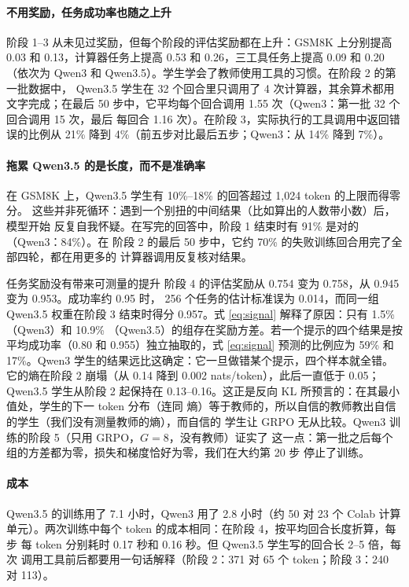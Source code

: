 \documentclass[11pt,a4paper,fontset=none]{ctexart}
\begin{document}
\paragraph{不用奖励，任务成功率也随之上升}
阶段 1--3 从未见过奖励，但每个阶段的评估奖励都在上升：GSM8K 上分别提高 0.03 和
0.13，计算器任务上提高 0.53 和 0.26，三工具任务上提高 0.09 和 0.20（依次为
Qwen3 和 Qwen3.5）。学生学会了教师使用工具的习惯。在阶段 2 的第一批数据中，
Qwen3.5 学生在 32 个回合里只调用了 4 次计算器，其余算术都用文字完成；在最后
50 步中，它平均每个回合调用 1.55 次（Qwen3：第一批 32 个回合调用 15 次，最后
每回合 1.16 次）。在阶段 3，实际执行的工具调用中返回错误的比例从 21\% 降到
4\%（前五步对比最后五步；Qwen3：从 14\% 降到 7\%）。

\paragraph{拖累 Qwen3.5 的是长度，而不是准确率}
在 GSM8K 上，Qwen3.5 学生有 10\%--18\% 的回答超过 1{,}024 token 的上限而得零分。
这些并非死循环：遇到一个别扭的中间结果（比如算出的人数带小数）后，模型开始
反复自我怀疑。在写完的回答中，阶段 1 结束时有 91\% 是对的（Qwen3：84\%）。在
阶段 2 的最后 50 步中，它约 70\% 的失败训练回合用完了全部四轮，都在用更多的
计算器调用反复核对结果。

\begin{findbox}{任务奖励没有带来可测量的提升}
阶段 4 的评估奖励从 0.754 变为 0.758，从 0.945 变为 0.953。成功率约 0.95 时，
256 个任务的估计标准误为 0.014，而同一组 Qwen3.5 权重在阶段 3 结束时得分
0.957。式 \eqref{eq:signal} 解释了原因：只有 1.5\%（Qwen3）和 10.9\%
（Qwen3.5）的组存在奖励方差。若一个提示的四个结果是按平均成功率（0.80 和
0.955）独立抽取的，式 \eqref{eq:signal} 预测的比例应为 59\% 和 17\%。Qwen3
学生的结果远比这确定：它一旦做错某个提示，四个样本就全错。它的熵在阶段 2 崩塌（从
0.14 降到 0.002 nats/token），此后一直低于 0.05；Qwen3.5 学生从阶段 2 起保持在
0.13--0.16。这正是反向 KL 所预言的：在其最小值处，学生的下一 token 分布（连同
熵）等于教师的，所以自信的教师教出自信的学生（我们没有测量教师的熵），而自信的
学生让 GRPO 无从比较。Qwen3 训练的阶段 5（只用 GRPO，$G=8$，没有教师）证实了
这一点：第一批之后每个组的方差都为零，损失和梯度恰好为零，我们在大约第 20 步
停止了训练。
\end{findbox}

\paragraph{成本}
Qwen3.5 的训练用了 7.1 小时，Qwen3 用了 2.8 小时（约 50 对 23 个 Colab 计算
单元）。两次训练中每个 token 的成本相同：在阶段 4，按平均回合长度折算，每步
每 token 分别耗时 0.17 秒和 0.16 秒。但 Qwen3.5 学生写的回合长 2--5 倍，每次
调用工具前后都要用一句话解释（阶段 2：371 对 65 个 token；阶段 3：240 对 113）。
\end{document}
